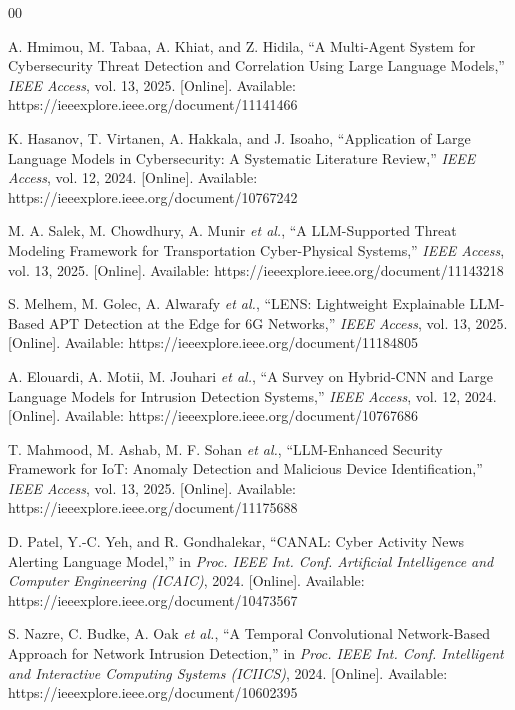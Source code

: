 \documentclass[conference]{IEEEtran}
\begin{document}

\begin{thebibliography}{00}

A. Hmimou, M. Tabaa, A. Khiat, and Z. Hidila,
``A Multi-Agent System for Cybersecurity Threat Detection and Correlation
Using Large Language Models,'' \textit{IEEE Access}, vol. 13, 2025.
[Online]. Available: https://ieeexplore.ieee.org/document/11141466

K. Hasanov, T. Virtanen, A. Hakkala, and J. Isoaho,
``Application of Large Language Models in Cybersecurity: A Systematic
Literature Review,'' \textit{IEEE Access}, vol. 12, 2024.
[Online]. Available: https://ieeexplore.ieee.org/document/10767242

M. A. Salek, M. Chowdhury, A. Munir \textit{et al.},
``A LLM-Supported Threat Modeling Framework for Transportation
Cyber-Physical Systems,'' \textit{IEEE Access}, vol. 13, 2025.
[Online]. Available: https://ieeexplore.ieee.org/document/11143218

S. Melhem, M. Golec, A. Alwarafy \textit{et al.},
``LENS: Lightweight Explainable LLM-Based APT Detection at the Edge for
6G Networks,'' \textit{IEEE Access}, vol. 13, 2025.
[Online]. Available: https://ieeexplore.ieee.org/document/11184805

A. Elouardi, A. Motii, M. Jouhari \textit{et al.},
``A Survey on Hybrid-CNN and Large Language Models for Intrusion Detection
Systems,'' \textit{IEEE Access}, vol. 12, 2024.
[Online]. Available: https://ieeexplore.ieee.org/document/10767686

T. Mahmood, M. Ashab, M. F. Sohan \textit{et al.},
``LLM-Enhanced Security Framework for IoT: Anomaly Detection and Malicious
Device Identification,'' \textit{IEEE Access}, vol. 13, 2025.
[Online]. Available: https://ieeexplore.ieee.org/document/11175688

D. Patel, Y.-C. Yeh, and R. Gondhalekar,
``CANAL: Cyber Activity News Alerting Language Model,''
in \textit{Proc. IEEE Int. Conf. Artificial Intelligence and Computer
Engineering (ICAIC)}, 2024.
[Online]. Available: https://ieeexplore.ieee.org/document/10473567

S. Nazre, C. Budke, A. Oak \textit{et al.},
``A Temporal Convolutional Network-Based Approach for Network Intrusion
Detection,'' in \textit{Proc. IEEE Int. Conf. Intelligent and Interactive
Computing Systems (ICIICS)}, 2024.
[Online]. Available: https://ieeexplore.ieee.org/document/10602395


\end{thebibliography}
\end{document}
